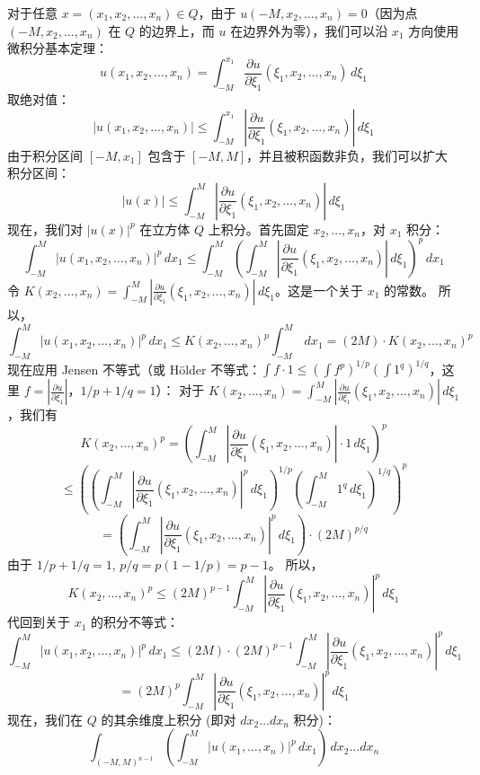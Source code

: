 对于任意 $x = (x_1, x_2, \dots, x_n) \in Q$，由于 $u(-M, x_2, \dots, x_n) = 0$（因为点 $(-M, x_2, \dots, x_n)$ 在 $Q$ 的边界上，而 $u$ 在边界外为零），我们可以沿 $x_1$ 方向使用微积分基本定理：
\[
u(x_1, x_2, \dots, x_n) = \int_{-M}^{x_1} \frac{\partial u}{\partial \xi_1}(\xi_1, x_2, \dots, x_n) \, d\xi_1
\]
取绝对值：
\[
|u(x_1, x_2, \dots, x_n)| \le \int_{-M}^{x_1} \left|\frac{\partial u}{\partial \xi_1}(\xi_1, x_2, \dots, x_n)\right| \, d\xi_1
\]
由于积分区间 $[-M, x_1]$ 包含于 $[-M, M]$，并且被积函数非负，我们可以扩大积分区间：
\[
|u(x)| \le \int_{-M}^{M} \left|\frac{\partial u}{\partial \xi_1}(\xi_1, x_2, \dots, x_n)\right| \, d\xi_1
\]
现在，我们对 $|u(x)|^p$ 在立方体 $Q$ 上积分。首先固定 $x_2, \dots, x_n$，对 $x_1$ 积分：
\[
\int_{-M}^{M} |u(x_1, x_2, \dots, x_n)|^p \, dx_1 \le \int_{-M}^{M} \left( \int_{-M}^{M} \left|\frac{\partial u}{\partial \xi_1}(\xi_1, x_2, \dots, x_n)\right| \, d\xi_1 \right)^p \, dx_1
\]
令 $K(x_2, \dots, x_n) = \int_{-M}^{M} \left|\frac{\partial u}{\partial \xi_1}(\xi_1, x_2, \dots, x_n)\right| \, d\xi_1$。这是一个关于 $x_1$ 的常数。
所以，
\[
\int_{-M}^{M} |u(x_1, x_2, \dots, x_n)|^p \, dx_1 \le K(x_2, \dots, x_n)^p \int_{-M}^{M} \, dx_1 = (2M) \cdot K(x_2, \dots, x_n)^p
\]
现在应用 Jensen 不等式（或 Hölder 不等式：$\int f \cdot 1 \le (\int f^p)^{1/p} (\int 1^q)^{1/q}$，这里 $f = |\frac{\partial u}{\partial \xi_1}|$，$1/p + 1/q = 1$）：
对于 $K(x_2, \dots, x_n) = \int_{-M}^{M} \left|\frac{\partial u}{\partial \xi_1}(\xi_1, x_2, \dots, x_n)\right| \, d\xi_1$，我们有
\[
K(x_2, \dots, x_n)^p = \left( \int_{-M}^{M} \left|\frac{\partial u}{\partial \xi_1}(\xi_1, x_2, \dots, x_n)\right| \cdot 1 \, d\xi_1 \right)^p
\]
\[
\le \left( \left( \int_{-M}^{M} \left|\frac{\partial u}{\partial \xi_1}(\xi_1, x_2, \dots, x_n)\right|^p \, d\xi_1 \right)^{1/p} \left( \int_{-M}^{M} 1^q \, d\xi_1 \right)^{1/q} \right)^p
\]
\[
= \left( \int_{-M}^{M} \left|\frac{\partial u}{\partial \xi_1}(\xi_1, x_2, \dots, x_n)\right|^p \, d\xi_1 \right) \cdot (2M)^{p/q}
\]
由于 $1/p + 1/q = 1$, $p/q = p(1-1/p) = p-1$。
所以，
\[
K(x_2, \dots, x_n)^p \le (2M)^{p-1} \int_{-M}^{M} \left|\frac{\partial u}{\partial \xi_1}(\xi_1, x_2, \dots, x_n)\right|^p \, d\xi_1
\]
代回到关于 $x_1$ 的积分不等式：
\[
\int_{-M}^{M} |u(x_1, x_2, \dots, x_n)|^p \, dx_1 \le (2M) \cdot (2M)^{p-1} \int_{-M}^{M} \left|\frac{\partial u}{\partial \xi_1}(\xi_1, x_2, \dots, x_n)\right|^p \, d\xi_1
\]
\[
= (2M)^p \int_{-M}^{M} \left|\frac{\partial u}{\partial \xi_1}(\xi_1, x_2, \dots, x_n)\right|^p \, d\xi_1
\]
现在，我们在 $Q$ 的其余维度上积分 (即对 $dx_2 \dots dx_n$ 积分)：
\[
\int_{(-M,M)^{n-1}} \left( \int_{-M}^{M} |u(x_1, \dots, x_n)|^p \, dx_1 \right) \, dx_2 \dots dx_n
\]

